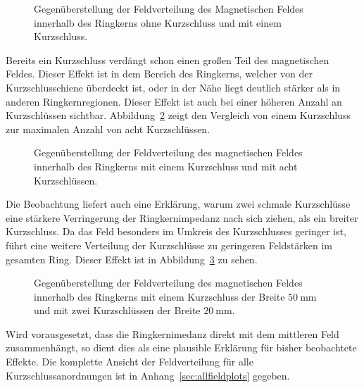 \begin{figure}[htb]
	\centering
	\hspace{0.03\textwidth}
	\caption{Gegen\"uberstellung der Feldverteilung des Magnetischen Feldes innerhalb des Ringkerns ohne Kurzschluss und mit einem Kurzschluss.}
	\label{fig:0zu1ks}
\end{figure}
\par
Bereits ein Kurzschluss verd\"angt schon einen gro\ss{}en Teil des magnetischen Feldes. Dieser Effekt ist in dem Bereich des Ringkerns, welcher von der Kurzschlusschiene \"uberdeckt ist, oder in der N\"ahe liegt deutlich st\"arker als in anderen Ringkernregionen. Dieser Effekt ist auch bei einer h\"oheren Anzahl an Kurzschl\"ussen sichtbar. Abbildung~\ref{fig:1zu8ks} zeigt den Vergleich von einem Kurzschluss zur maximalen Anzahl von acht Kurzschl\"ussen.
\begin{figure}[htb]
	\centering
	\hspace{0.03\textwidth}
	\caption{Gegen\"uberstellung der Feldverteilung des magnetischen Feldes innerhalb des Ringkerns mit einem Kurzschluss und mit acht Kurzschl\"ussen.}
	\label{fig:1zu8ks}
\end{figure}
\par
Die Beobachtung liefert auch eine Erkl\"arung, warum zwei schmale Kurzschl\"usse eine st\"arkere Verringerung der Ringkernimpedanz nach sich ziehen, als ein breiter Kurzschluss. Da das Feld besonders im Umkreis des Kurzschlusses geringer ist, f\"uhrt eine weitere Verteilung der Kurzschl\"usse zu geringeren Feldst\"arken im gesamten Ring. Dieser Effekt ist in Abbildung~\ref{fig:150zu220ks} zu sehen. 
\begin{figure}[htb]
	\centering
	\hspace{0.03\textwidth}
	\caption{Gegen\"uberstellung der Feldverteilung des magnetischen Feldes innerhalb des Ringkerns mit einem Kurzschluss der Breite $\SI{50}{\milli\meter}$ und mit zwei Kurzschl\"ussen der Breite $\SI{20}{\milli\meter}$.}
	\label{fig:150zu220ks}
\end{figure}
\par
Wird vorausgesetzt, dass die Ringkernimedanz direkt mit dem mittleren Feld zusammenh\"angt, so dient dies als eine plausible Erkl\"arung f\"ur bisher beobachtete Effekte. Die komplette Ansicht der Feldverteilung f\"ur alle Kurzschlussanordnungen ist in Anhang~\ref{sec:allfieldplots} gegeben.